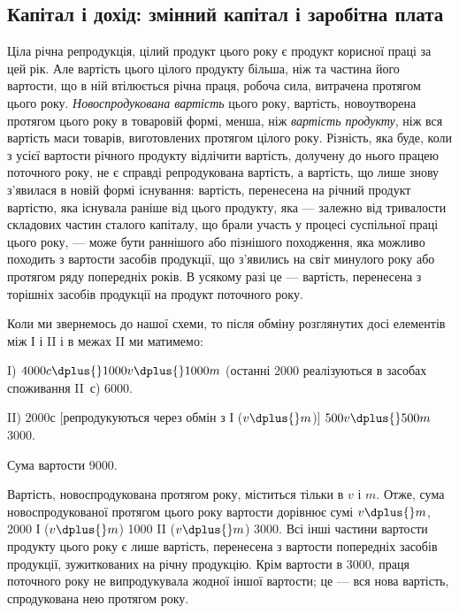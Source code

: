 
\subsection[Капітал і дохід: змінний капітал і заробітна плата]{Капітал і дохід: змінний капітал і заробітна плата\footnotemark{}}

\label{original-338}
Ціла
річна репродукція, цілий продукт цього року є продукт корисної
праці за цей рік. Але вартість цього цілого продукту більша, ніж
та частина його вартости, що в ній втілюється річна праця, робоча
сила, витрачена протягом цього року. \emph{Новоспродукована вартість}
цього року, вартість, новоутворена протягом цього року в товаровій
формі, менша, ніж \emph{вартість продукту}, ніж вся вартість маси товарів,
виготовлених протягом цілого року. Різність, яка буде, коли з усієї
вартости річного продукту відлічити вартість, долучену до нього працею
поточного року, не є справді репродукована вартість, а вартість, що лише
знову з’явилася в новій формі існування: вартість, перенесена на річний
продукт вартістю, яка існувала раніше від цього продукту, яка — залежно
від тривалости складових частин сталого капіталу, що брали участь у
процесі суспільної праці цього року, — може бути раннішого або пізнішого
походження, яка можливо походить з вартости засобів продукції,
що з’явились на світ минулого року або протягом ряду попередніх років.
В усякому разі це — вартість, перенесена з торішніх засобів продукції
на продукт поточного року.

Коли ми звернемось до нашої схеми, то після обміну розглянутих досі
елементів між І і II і в межах II ми матимемо:

I) $4000 c \dplus{} 1000 v \dplus{} 1000 m$ (останні 2000 реалізуються в засобах
споживання II~$с$) \deq{} 6000.

II) $2000 с$ [репродукуються через обмін з І ($v \dplus{} m$)] \dplus{} $500 v \dplus{} 500 m$ \deq{} 3000.

Сума вартости \deq{} 9000.

Вартість, новоспродукована протягом року, міститься тільки в $v$ і $m$.
Отже, сума новоспродукованої протягом цього року вартости дорівнює
сумі $v \dplus{} m$, \deq{} 2000 І ($v \dplus{} m$) \dplus{} 1000 II ($v \dplus{} m$) \deq{} 3000. Всі інші частини
вартости продукту цього року є лише вартість, перенесена з вартости
попередніх засобів продукції, зужиткованих на річну продукцію.
Крім вартости в 3000, праця поточного року не випродукувала жодної
іншої вартости; це — вся нова вартість, спродукована нею протягом року.

